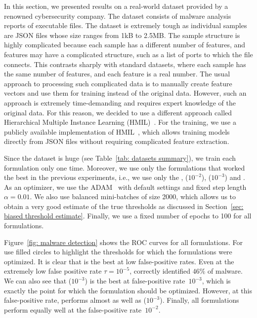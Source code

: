 In this section, we presented results on a real-world dataset provided by a renowned cybersecurity company. The dataset consists of malware analysis reports of executable files. The dataset is extremely tough as individual samples are JSON files whose size ranges from 1kB to 2.5MB. The sample structure is highly complicated because each sample has a different number of features, and features may have a complicated structure, such as a list of ports to which the file connects. This contrasts sharply with standard datasets, where each sample has the same number of features, and each feature is a real number. The usual approach to processing such complicated data is to manually create feature vectors and use them for training instead of the original data. However, such an approach is extremely time-demanding and requires expert knowledge of the original data. For this reason, we decided to use a different approach called Hierarchical Multiple Instance Learning (HMIL)~\cite{pevny2017using}. For the training, we use a publicly available implementation of HMIL~\cite{mandlik2021mill}, which allows training models directly from JSON files without requiring complicated feature extraction.

Since the dataset is huge (see Table~\ref{tab: datasets summary}), we train each formulation only one time. Moreover, we use only the formulations that worked the best in the previous experiments, i.e., we use only the \BaseLine, \PatMatNP($10^{-2}$), \PatMatNP($10^{-3}$) and \BaseLine. As an optimizer, we use the ADAM~\cite{kingma2014adam} with default settings and fixed step length~$\alpha = 0.01.$ We also use balanced mini-batches of size 2000, which allows us to obtain a very good estimate of the true thresholds as discussed in Section~\ref{sec: biased threshold estimate}. Finally, we use a fixed number of epochs to 100 for all formulations.

Figure~\ref{fig: malware detection} shows the ROC curves for all formulations. For use filled circles to highlight the thresholds for which the formulations were optimized. It is clear that \DeepTopPush is the best at low false-positive rates. Even at the extremely low false positive rate $\tau=10^{-5}$, \DeepTopPush correctly identified $46\%$ of malware. We can also see that \PatMatNP($10^{-3}$) is the best at false-positive rate~$10^{-3}$, which is exactly the point for which the formulation should be optimized. However, at this false-positive rate, \DeepTopPush performs almost as well as \PatMatNP($10^{-3}$). Finally, all formulations perform equally well at the false-positive rate~$10^{-2}$.

